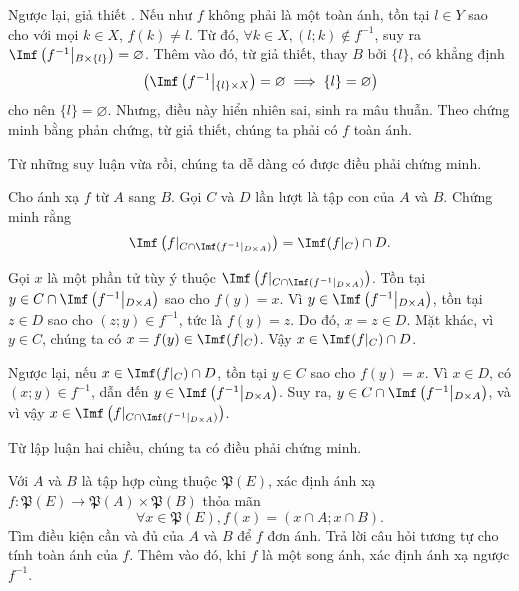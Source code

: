 Ngược lại, giả thiết . Nếu như $f$ không phải là một toàn ánh, tồn tại $l \in Y$ sao cho với mọi $k \in X$, $f(k) \neq l$. Từ đó, $\forall k \in X, (l; k) \notin f^{-1}$, suy ra $\Imf\left(f^{-1}\middle|_{B \times \{l\}}\right) = \varnothing$. Thêm vào đó, từ giả thiết, thay $B$ bởi $\{l\}$, có khẳng định \begin{equation*}
   \left(\Imf\left(f^{-1}\middle|_{\{l\} \times X}\right) = \varnothing \implies \{l\} = \varnothing\right)
\end{equation*} cho nên $\{l\} = \varnothing$. Nhưng, điều này hiển nhiên sai, sinh ra mâu thuẫn. Theo chứng minh bằng phản chứng, từ giả thiết, chúng ta phải có $f$ toàn ánh.

Từ những suy luận vừa rồi, chúng ta dễ dàng có được điều phải chứng minh.

\exercise Cho ánh xạ $f$ từ $A$ sang $B$. Gọi $C$ và $D$ lần lượt là tập con của $A$ và $B$. Chứng minh rằng \begin{equation*}
   \Imf\left(f|_{C \cap \Imf\left(f^{-1}\middle|_{D \times A}\right)}\right) = \Imf(f|_C) \cap D.
\end{equation*}

\solution

Gọi $x$ là một phần tử tùy ý thuộc $\Imf\left(f|_{C \cap \Imf\left(f^{-1}\middle|_{D \times A}\right)}\right)$. Tồn tại $y \in C \cap \Imf\left(f^{-1}\middle|_{D \times A}\right)$ sao cho $f(y) = x$. Vì $y \in \Imf\left(f^{-1}\middle|_{D \times A}\right)$, tồn tại $z \in D$ sao cho $(z; y) \in f^{-1}$, tức là $f(y) = z$. Do đó, $x = z \in D$. Mặt khác, vì $y \in C$, chúng ta có $x = f(y) \in \Imf(f|_C)$. Vậy $x \in \Imf(f|_C) \cap D$.

Ngược lại, nếu $x \in \Imf(f|_C) \cap D$, tồn tại $y \in C$ sao cho $f(y) = x$. Vì $x \in D$, có $(x; y) \in f^{-1}$, dẫn đến $y \in \Imf\left(f^{-1}\middle|_{D \times A}\right)$. Suy ra, $y \in C \cap \Imf\left(f^{-1}\middle|_{D \times A}\right)$, và vì vậy $x \in \Imf\left(f|_{C \cap \Imf\left(f^{-1}\middle|_{D \times A}\right)}\right)$.

Từ lập luận hai chiều, chúng ta có điều phải chứng minh.

\exercise Với $A$ và $B$ là tập hợp cùng thuộc $\mathfrak{P}(E)$, xác định ánh xạ $f: \mathfrak{P}(E) \to \mathfrak{P}(A) \times \mathfrak{P}(B)$ thỏa mãn \begin{equation*}
   \forall x \in \mathfrak{P}(E), f(x) = (x \cap A; x \cap B).
\end{equation*}
Tìm điều kiện cần và đủ của $A$ và $B$ để $f$ đơn ánh. Trả lời câu hỏi tương tự cho tính toàn ánh của $f$. Thêm vào đó, khi $f$ là một song ánh, xác định ánh xạ ngược $f^{-1}$.

